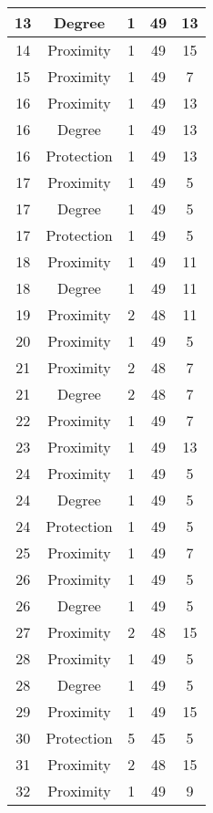 \documentclass[results.tex]{subfiles}
\begin{document}
\begin{center}
\begin{tabular}{| c || c | c | c | c |}
    \hline
    13 & Degree & 1 & 49 & 13 \\ 
    \hline
    14 & Proximity & 1 & 49 & 15 \\ 
    \hline
    15 & Proximity & 1 & 49 & 7 \\ 
    \hline
    16 & Proximity & 1 & 49 & 13 \\ 
    \hline
    16 & Degree & 1 & 49 & 13 \\ 
    \hline
    16 & Protection & 1 & 49 & 13 \\ 
    \hline
    17 & Proximity & 1 & 49 & 5 \\ 
    \hline
    17 & Degree & 1 & 49 & 5 \\ 
    \hline
    17 & Protection & 1 & 49 & 5 \\ 
    \hline
    18 & Proximity & 1 & 49 & 11 \\ 
    \hline
    18 & Degree & 1 & 49 & 11 \\ 
    \hline
    19 & Proximity & 2 & 48 & 11 \\ 
    \hline
    20 & Proximity & 1 & 49 & 5 \\ 
    \hline
    21 & Proximity & 2 & 48 & 7 \\ 
    \hline
    21 & Degree & 2 & 48 & 7 \\ 
    \hline
    22 & Proximity & 1 & 49 & 7 \\ 
    \hline
    23 & Proximity & 1 & 49 & 13 \\ 
    \hline
    24 & Proximity & 1 & 49 & 5 \\ 
    \hline
    24 & Degree & 1 & 49 & 5 \\ 
    \hline
    24 & Protection & 1 & 49 & 5 \\ 
    \hline
    25 & Proximity & 1 & 49 & 7 \\ 
    \hline
    26 & Proximity & 1 & 49 & 5 \\ 
    \hline
    26 & Degree & 1 & 49 & 5 \\ 
    \hline
    27 & Proximity & 2 & 48 & 15 \\ 
    \hline
    28 & Proximity & 1 & 49 & 5 \\ 
    \hline
    28 & Degree & 1 & 49 & 5 \\ 
    \hline
    29 & Proximity & 1 & 49 & 15 \\ 
    \hline
    30 & Protection & 5 & 45 & 5 \\ 
    \hline
    31 & Proximity & 2 & 48 & 15 \\ 
    \hline
    32 & Proximity & 1 & 49 & 9 \\ 

\end{tabular}
\end{center}
\end{document}
